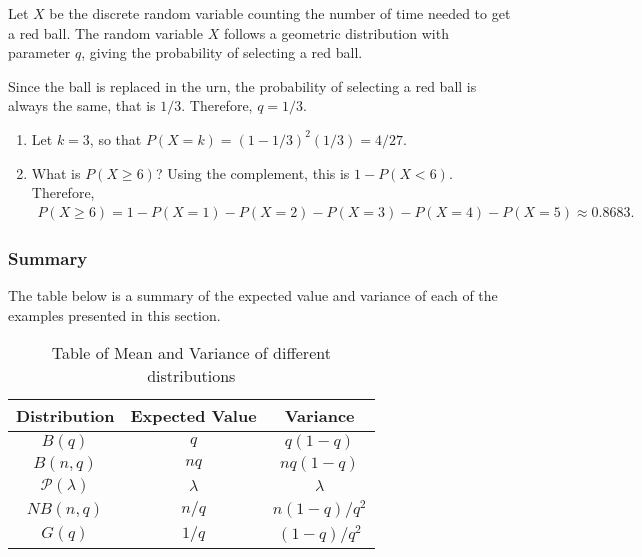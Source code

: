 \begin{sol*}
Let $X$ be the discrete random variable counting the number of time needed to get a red ball. The random variable $X$ follows a geometric distribution with parameter $q$, giving the probability of selecting a red ball.

Since the ball is replaced in the urn, the probability of selecting a red ball is always the same, that is $1/3$. Therefore, $q = 1/3$.
\begin{enumerate}[label=\alph*)]
    \item Let $k = 3$, so that $P (X = k) = (1 - 1/3)^2 (1/3) = 4 / 27$.
    \item What is $P (X \geq 6)$? Using the complement, this is $1 - P (X < 6)$. Therefore,
        \begin{align*}
        P (X \geq 6) = 1 - P (X = 1) - P (X = 2) - P (X = 3) - P (X = 4) - P (X = 5) \approx 0.8683 . \tag*{$\triangle$}
        \end{align*}
\end{enumerate}
\end{sol*}

\subsubsection*{Summary}

The table below is a summary of the expected value and variance of each of the examples presented in this section.

\begin{table}[ht]
\centering
\begin{tabular}{||c|c|c||}
\hline\hline
Distribution & Expected Value & Variance \\ \hline\hline 
$B(q)$ & $q$ & $q (1 - q)$ \\ \hline
$B(n, q)$ & $nq$ & $nq (1 - q)$ \\\hline
$\mathcal{P} (\lambda )$ & $\lambda$ & $\lambda$ \\\hline 
$NB (n, q)$ & $n /q$ & $n(1 - q) / q^2$ \\\hline
$G (q)$ & $1/q$ & $(1 - q) / q^2$ \\\hline \hline
\end{tabular}
\caption{Table of Mean and Variance of different distributions}
\end{table}

